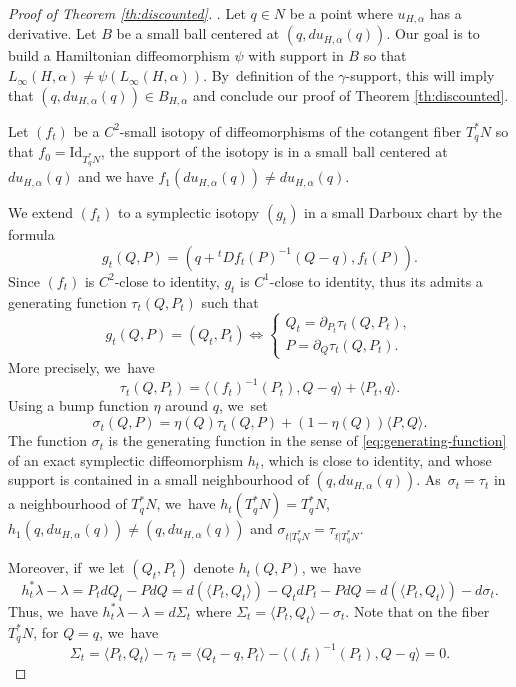 \documentclass[10pt]{amsart}
\theoremstyle{definition}
\begin{document}
\begin{proof}[Proof of Theorem \ref{th:discounted}]. Let $q\in N$ be a point where $u_{H, \alpha}$ has a derivative. Let $B$ be a small ball centered at $(q, du_{H, \alpha}(q))$. Our goal is to build a Hamiltonian diffeomorphism $\psi$ with support in $B$ so that $L_\infty(H, \alpha)\neq\psi(L_\infty(H, \alpha))$. By~definition of the $\gamma$\nobreakdash-support, this will imply that $(q, du_{H, \alpha}(q))\in B_{H, \alpha}$ and conclude our proof of Theorem \ref{th:discounted}.

Let $(f_t)$ be a $C^2$-small isotopy of diffeomorphisms of the cotangent fiber $T^*_qN$ so that $f_0=\text{Id}_{T^*_qN}$, the support of the isotopy is in a small ball centered at $du_{H, \alpha}(q)$ and we have $f_1(du_{H, \alpha}(q))\neq du_{H,\alpha}(q)$.

We extend $(f_t)$ to a symplectic isotopy $(g_t)$ in a small Darboux chart by the formula
\[
g_t(Q, P)=(q+{}^tDf_t(P)^{-1}(Q-q), f_t(P)).
\]
Since $(f_t)$ is $C^2$-close to identity, $g_t$ is $C^1$-close to identity, thus its admits a generating function $\tau_t(Q, P_t)$ such that
\begin{equation} \label{eq:generating-function} g_t(Q, P)=(Q_t, P_t)\Longleftrightarrow
\begin{cases}
Q_t=\partial_{P_t}\tau_t(Q, P_t),\\ P=\partial_Q\tau_t(Q, P_t).
\end{cases}
\end{equation}
More precisely, we~have
\[
\tau_t(Q, P_t)=\langle (f_t)^{-1}(P_t), Q-q\rangle+\langle P_t,q\rangle.
\]
Using a bump function $\eta$ around $q$, we~set
\[
\sigma_t(Q, P)=\eta(Q)\tau_t(Q, P)+(1-\eta (Q))\langle P,Q\rangle.
\]
The function $\sigma_t$ is the generating function in the sense of \eqref{eq:generating-function} of an exact symplectic diffeomorphism $h_t$, which is close to identity, and whose support is contained in a small neighbourhood of $(q, du_{H, \alpha}(q))$. As~$\sigma_t=\tau_t$ in a neighbourhood of $T^*_qN$, we~have $h_t(T^*_qN)=T^*_qN$, $h_1(q, du_{H, \alpha}(q))\neq (q, du_{H, \alpha}(q))$ and $\sigma_{t|T^*_qN}=\tau_{t|T^*_qN}$.

Moreover, if~we let $(Q_t, P_t)$ denote $h_t(Q, P)$, we~have
\[
h_t^*\lambda-\lambda=P_tdQ_t-PdQ=d(\langle P_t,Q_t\rangle)-Q_tdP_t-PdQ=d(\langle P_t,Q_t\rangle)-d\sigma_t.
\]
Thus, we~have $h_t^*\lambda-\lambda=d\Sigma_t$ where $\Sigma_t=\langle P_t,Q_t\rangle-\sigma_t$.
Note that on the fiber $T_q^*N$, \ie for $Q=q$, we~have
\[
\Sigma_t
=\langle P_t,Q_t\rangle-\tau_t=\langle Q_t-q, P_t\rangle-\langle (f_t)^{-1}(P_t), Q-q\rangle=0.
\]


\end{proof}
\end{document}
